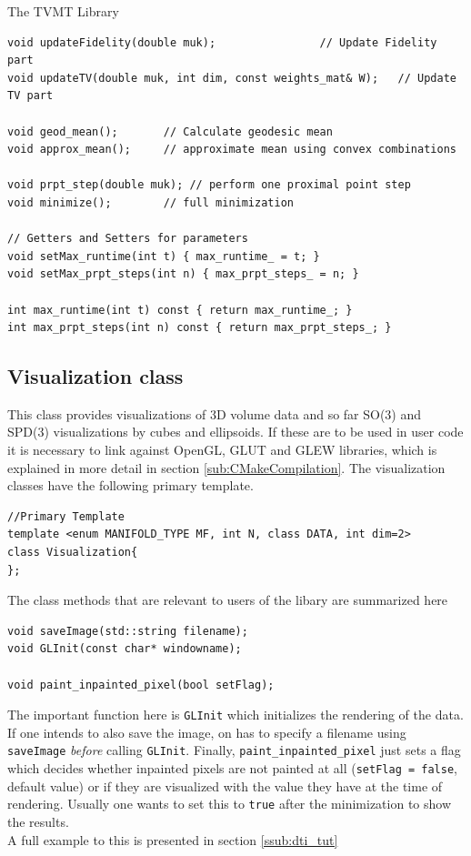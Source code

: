 \begin{chapter}{The TVMT Library}
\begin{lstlisting}
void updateFidelity(double muk);			    // Update Fidelity part
void updateTV(double muk, int dim, const weights_mat& W);   // Update TV part

void geod_mean();	    // Calculate geodesic mean
void approx_mean();	    // approximate mean using convex combinations

void prpt_step(double muk); // perform one proximal point step
void minimize();	    // full minimization

// Getters and Setters for parameters
void setMax_runtime(int t) { max_runtime_ = t; }
void setMax_prpt_steps(int n) { max_prpt_steps_ = n; }
	    
int max_runtime(int t) const { return max_runtime_; }
int max_prpt_steps(int n) const { return max_prpt_steps_; }
\end{lstlisting}



\subsection{Visualization class} %
\label{sub:Visualization class}
This class provides visualizations of 3D volume data and so far SO(3) and SPD(3) visualizations by cubes and ellipsoids. If these are to be used in user code it is necessary to link
against OpenGL, GLUT and GLEW libraries, which is explained in more detail in section \ref{sub:CMakeCompilation}. The visualization classes have the following primary template.
\cppinline
\begin{lstlisting}
//Primary Template
template <enum MANIFOLD_TYPE MF, int N, class DATA, int dim=2>
class Visualization{
};
\end{lstlisting}

The class methods that are relevant to users of the libary are summarized here\\
\cppinline
\begin{lstlisting}
void saveImage(std::string filename);
void GLInit(const char* windowname);

void paint_inpainted_pixel(bool setFlag);
\end{lstlisting}

The important function here is \texttt{GLInit} which initializes the rendering of the data. If one intends to also save the image, on has to specify a filename using
\texttt{saveImage} \textit{before} calling \texttt{GLInit}. Finally, \texttt{paint\_inpainted\_pixel} just sets a flag which decides whether inpainted pixels are not painted
at all (\texttt{setFlag = false}, default value) or if they are visualized with the value they have at the time of rendering. Usually one wants to set this to \texttt{true}
after the minimization to show the results.\\
A full example to this is presented in section \ref{ssub:dti_tut}\\


\end{chapter}
